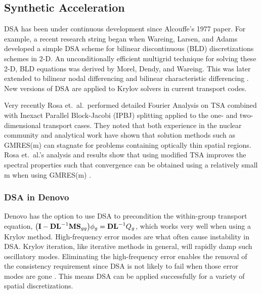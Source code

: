 \subsection{Synthetic Acceleration}
DSA has been under continuous development since Alcouffe's 1977 paper. For example, a recent research string began when Wareing, Larsen, and Adams developed a simple DSA scheme for bilinear discontinuous (BLD) discretizations schemes in 2-D. An unconditionally efficient multigrid technique for solving these 2-D, BLD equations was derived by Morel, Dendy, and Wareing. This was later extended to bilinear nodal differencing and bilinear characteristic differencing \cite{Adams2002}. New versions of DSA are applied to Krylov solvers in current transport codes.

Very recently Rosa et.\ al.\ performed detailed Fourier Analysis on TSA combined with Inexact Parallel Block-Jacobi (IPBJ) splitting applied to the one- and two-dimensional transport cases. They noted that both experience in the nuclear community and analytical work have shown that solution methods such as GMRES(m) can stagnate for problems containing optically thin spatial regions. Rosa et.\ al.'s analysis and results show that using modified TSA improves the spectral properties such that convergence can be obtained using a relatively small m when using GMRES(m) \cite{Rosa2010}.

\subsubsection{DSA in Denovo}
Denovo has the option to use DSA to precondition the within-group transport equation, $\bigl(\mathbf{I} - \mathbf{DL}^{-1}\mathbf{MS}_{gg}\bigr) \phi_{g} = \mathbf{DL}^{-1}Q_{g}$, which works very well when using a Krylov method. High-frequency error modes are what often cause instability in DSA. Krylov iteration, like iterative methods in general, will rapidly damp such oscillatory modes. Eliminating the high-frequency error enables the removal of the consistency requirement since DSA is not likely to fail when those error modes are gone \cite{Evans2009d}. This means DSA can be applied successfully for a variety of spatial discretizations. 

